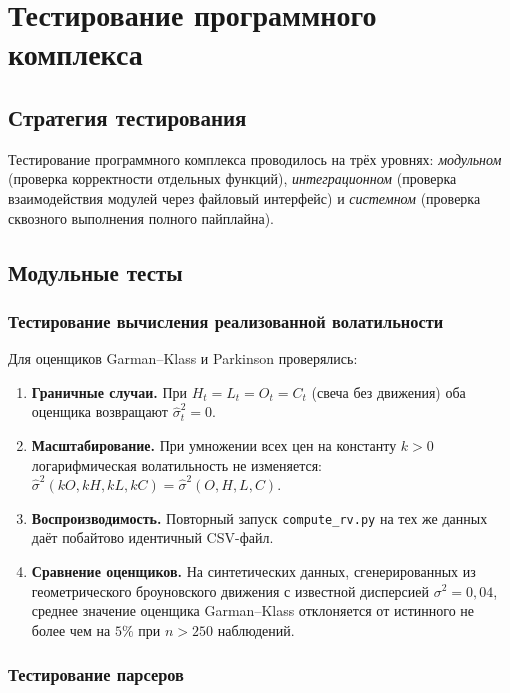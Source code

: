 \section{Тестирование программного комплекса}

\subsection{Стратегия тестирования}

Тестирование программного комплекса проводилось на трёх уровнях:
\textit{модульном} (проверка корректности отдельных функций),
\textit{интеграционном} (проверка взаимодействия модулей через файловый интерфейс)
и \textit{системном} (проверка сквозного выполнения полного пайплайна).

\subsection{Модульные тесты}

\subsubsection{Тестирование вычисления реализованной волатильности}

Для оценщиков Garman--Klass и Parkinson проверялись:
\begin{enumerate}
    \item \textbf{Граничные случаи.}
          При $H_t = L_t = O_t = C_t$ (свеча без движения)
          оба оценщика возвращают $\widehat{\sigma}^2_t = 0$.
    \item \textbf{Масштабирование.}
          При умножении всех цен на константу $k > 0$
          логарифмическая волатильность не изменяется:
          $\widehat{\sigma}^2(kO, kH, kL, kC) = \widehat{\sigma}^2(O, H, L, C)$.
    \item \textbf{Воспроизводимость.}
          Повторный запуск \texttt{compute\_rv.py} на тех же данных
          даёт побайтово идентичный CSV-файл.
    \item \textbf{Сравнение оценщиков.}
          На синтетических данных, сгенерированных из геометрического
          броуновского движения с известной дисперсией $\sigma^2 = 0{,}04$,
          среднее значение оценщика Garman--Klass отклоняется от истинного
          не более чем на $5\%$ при $n > 250$ наблюдений.
\end{enumerate}

\subsubsection{Тестирование парсеров}

